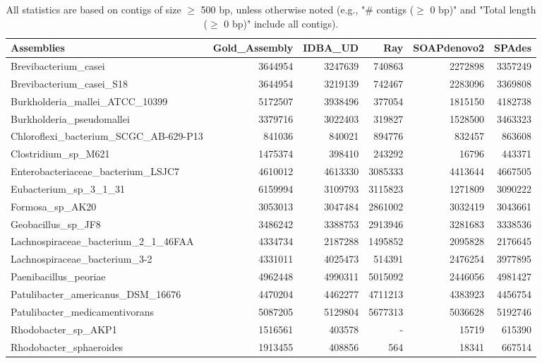 \documentclass[12pt,a4paper]{article}
\begin{document}
\begin{table}[ht]
\begin{center}
\caption{All statistics are based on contigs of size $\geq$ 500 bp, unless otherwise noted (e.g., "\# contigs ($\geq$ 0 bp)" and "Total length ($\geq$ 0 bp)" include all contigs).}
\begin{tabular}{|l*{5}{|r}|}
\hline
Assemblies & Gold\_Assembly & IDBA\_UD & Ray & SOAPdenovo2 & SPAdes \\ \hline
Brevibacterium\_casei & 3644954 & 3247639 & 740863 & 2272898 & 3357249 \\ \hline
Brevibacterium\_casei\_S18 & 3644954 & 3219139 & 742467 & 2283096 & 3369808 \\ \hline
Burkholderia\_mallei\_ATCC\_10399 & 5172507 & 3938496 & 377054 & 1815150 & 4182738 \\ \hline
Burkholderia\_pseudomallei & 3379716 & 3022403 & 319827 & 1528500 & 3463323 \\ \hline
Chloroflexi\_bacterium\_SCGC\_AB-629-P13 & 841036 & 840021 & 894776 & 832457 & 863608 \\ \hline
Clostridium\_sp\_M621 & 1475374 & 398410 & 243292 & 16796 & 443371 \\ \hline
Enterobacteriaceae\_bacterium\_LSJC7 & 4610012 & 4613330 & 3085333 & 4413644 & 4667505 \\ \hline
Eubacterium\_sp\_3\_1\_31 & 6159994 & 3109793 & 3115823 & 1271809 & 3090222 \\ \hline
Formosa\_sp\_AK20 & 3053013 & 3047484 & 2861002 & 3032419 & 3043661 \\ \hline
Geobacillus\_sp\_JF8 & 3486242 & 3388753 & 2913946 & 3281683 & 3338536 \\ \hline
Lachnospiraceae\_bacterium\_2\_1\_46FAA & 4334734 & 2187288 & 1495852 & 2095828 & 2176645 \\ \hline
Lachnospiraceae\_bacterium\_3-2 & 4331011 & 4025473 & 514391 & 2476254 & 3977895 \\ \hline
Paenibacillus\_peoriae & 4962448 & 4990311 & 5015092 & 2446056 & 4981427 \\ \hline
Patulibacter\_americanus\_DSM\_16676 & 4470204 & 4462277 & 4711213 & 4383923 & 4456754 \\ \hline
Patulibacter\_medicamentivorans & 5087205 & 5129804 & 5677313 & 5036628 & 5192746 \\ \hline
Rhodobacter\_sp\_AKP1 & 1516561 & 403578 & - & 15719 & 615390 \\ \hline
Rhodobacter\_sphaeroides & 1913455 & 408856 & 564 & 18341 & 667514 \\ \hline

\end{tabular}
\end{center}
\end{table}
\end{document}
